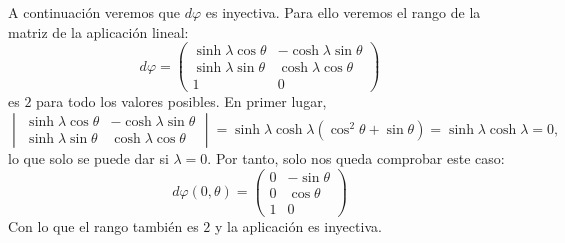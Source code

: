 A continuación veremos que $d \varphi$ es inyectiva. Para ello veremos el rango
de la matriz de la aplicación lineal:
\[
    d \varphi = \begin{pmatrix}
    \sinh \lambda \cos \theta & -\cosh \lambda \sin \theta\\
    \sinh \lambda \sin \theta & \cosh \lambda \cos \theta\\
    1 & 0
    \end{pmatrix}
\]
es $2$ para todo los valores posibles. En primer lugar,
\[
\begin{vmatrix} 
    \sinh \lambda \cos \theta & -\cosh \lambda \sin \theta\\
    \sinh \lambda \sin \theta & \cosh \lambda \cos \theta
\end{vmatrix} = \sinh \lambda \cosh \lambda \left( \cos^2 \theta + \sin \theta
\right) = \sinh \lambda \cosh \lambda = 0,
\]
lo que solo se puede dar si $\lambda = 0$. Por tanto, solo nos queda comprobar
este caso:
\[
d \varphi \left( 0, \theta \right) = \begin{pmatrix} 
    0 & -\sin \theta\\
    0 & \cos \theta\\
    1 & 0
\end{pmatrix}
\]
Con lo que el rango también es $2$ y la aplicación es inyectiva.

